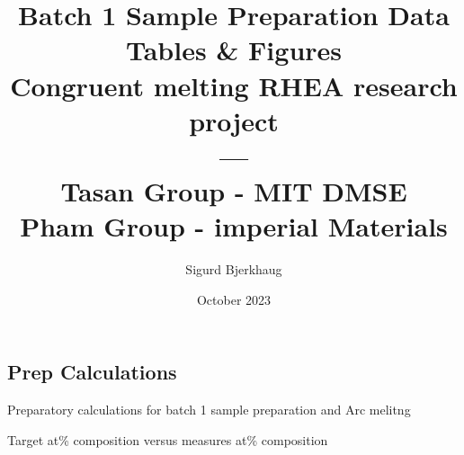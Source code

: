 \documentclass[a4]{article}
\title{Batch 1 Sample Preparation Data Tables \& Figures \\ Congruent melting RHEA research project \\ ---\\Tasan Group - MIT DMSE \\ Pham Group - imperial Materials \\}
\author{Sigurd Bjerkhaug}
\date{October 2023}
\begin{document}
\maketitle

\newpage



\begin{landscape}
\section{Prep Calculations}


\begin{table}[h]
    \centering
    \caption{Preparatory calculations for batch 1 sample preparation and Arc melitng}
    
    \label{tab:Batch1 preparation}
\end{table}

\end{landscape}
\newpage

\begin{table}[h]
    \centering
    \caption{Target at\% composition versus measures at\% composition}
    
    \label{tab:Batch1 comparison}
\end{table}
\end{document}
